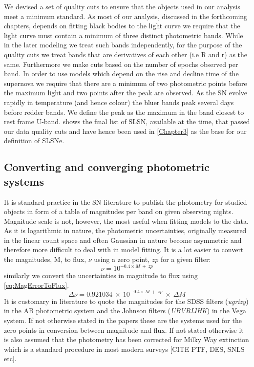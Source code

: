 We devised a set of quality cuts to ensure that the objects used in our analysis meet a minimum standard. As most of our analysis, discussed in the forthcoming chapters, depends on fitting black bodies to the light curve we require that the light curve must contain a minimum of three distinct photometric bands. While in the later modeling we treat such bands independently, for the purpose of the quality cuts we treat bands that are derivatives of each other (i.e R and r) as the same. Furthermore we make cuts based on the number of epochs observed per band. In order to use models which depend on the rise and decline time of the supernova we require that there are a minimum of two photometric points before the maximum light and two points after the peak are observed. As the SN evolve rapidly in temperature (and hence colour) the bluer bands peak several days before redder bands. We define the peak as the maximum in the band closest to rest frame U-band.  shows the final list of SLSN, available at the time, that passed our data quality cuts and have hence been used in \cref{Chapter3} as the base for our definition of SLSNe.

\subsection{Converting and converging photometric systems}
It is standard practice in the SN literature to publish the photometry for studied objects in form of a table of magnitudes per band on given observing nights. Magnitude scale is not, however, the most useful when fitting models to the data. As it is logarithmic in nature, the photometric uncertainties, originally measured in the linear count space and often Gaussian in nature become asymmetric and therefore more difficult to deal with in model fitting. It is a lot easier to convert the magnitudes, M, to flux, $\nu$ using a zero point, $zp$ for a given filter:
\begin{equation}
\label{eq:MagToFlux}
\nu = 10^{-0.4 \times M~+~zp}
\end{equation}
similarly we convert the uncertainties in magnitude to flux using \eqref{eq:MagErrorToFlux}.
\begin{equation}
\label{eq:MagErrorToFlux}
\Delta \nu = 0.921034~\times~10^{-0.4 \times M~+~zp}~\times~\Delta M
\end{equation}
It is customary in literature to quote the magnitudes for the SDSS filters (\textit{ugrizy}) in the AB photometric system and the Johnson filters (\textit{UBVRIJHK}) in the Vega system. If not otherwise stated in the papers these are the systems used for the zero points in conversion between magnitude and flux. If not stated otherwise it is also assumed that the photometry has been corrected for Milky Way extinction which is a standard procedure in most modern surveys [CITE PTF, DES, SNLS etc].

